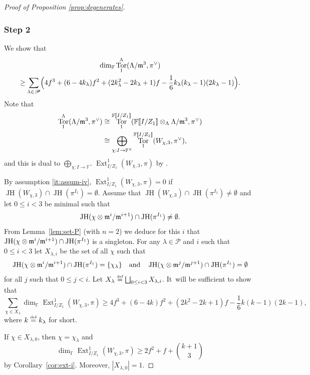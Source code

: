 \documentclass[JEP,XML,SOM,Unicode,NoFloatCountersInSection, NoEqCountersInSection,published]{cedram}
\newcommand{\quand}{\quad\text{and}\quad}
\newcommand{\defeq}{\stackrel{\textrm{\tiny{\upshape{def}}}}{=}}
\newcommand{\F}{\mathbb{F}}
\renewcommand{\P}{\mathscr P}
\newcommand{\s}{^\times}
\newcommand{\bbra}[1]{[\mkern-3mu[#1]\mkern-3mu]}
\DeclareMathOperator{\Ext}{Ext}
\DeclareMathOperator{\JH}{\mathrm{JH}}
\DeclareMathOperator{\Tor}{Tor}
\theoremstyle{plain}
\theoremstyle{definition}
\begin{document}
\begin{proof}[Proof of Proposition \ref{prop:degenerates}]
\subsubsection*{Step 2} We show that
\begin{multline*}
\dim_\F \Tor_1^{\Lambda}(\Lambda/\m^3,\pi^{\vee})\\
\ge \sum_{\lambda \in \P} \Bigl(4f^3 + (6-4k_\lambda)f^2 + (2k_\lambda^2-2k_\lambda+1)f - \frac 16 k_\lambda(k_\lambda-1)(2k_\lambda-1)\Bigr).
\end{multline*}
Note that
\begin{equation}\label{eq:Tor1-direct-sum}
\begin{aligned}
\Tor_1^{\Lambda}(\Lambda/\m^3,\pi^{\vee}) &\cong \Tor_1^{\F\bbra{I/Z_1}}(\F\bbra{I/Z_1} \otimes_\Lambda \Lambda/\m^3,\pi^{\vee})\\
&\cong \bigoplus_{\chi: I \to \F\s} \Tor_1^{\F\bbra{I/Z_1}}(W_{\chi,3},\pi^{\vee}),
\end{aligned}
\end{equation}
and this is dual to $\bigoplus_{\chi: I \to \F\s} \Ext^1_{I/Z_1}(W_{\chi,3},\pi)$ by \cite[Lem.\,2.6.2]{BHHMS4}.

By assumption \eqref{it:assum-iv}, $\Ext^1_{I/Z_1}(W_{\chi,3},\pi) = 0$ if $\JH(W_{\chi,3}) \cap \JH(\pi^{I_1}) = \emptyset$.
Assume that $\JH(W_{\chi,3}) \cap \JH(\pi^{I_1}) \ne \emptyset$ and let $0 \le i < 3$ be minimal such that
\[
\JH(\chi \otimes \m^i/\m^{i+1}) \cap \JH(\pi^{I_1}) \neq \emptyset.
\]
From Lemma~\ref{lem:set-P} (with $n = 2$) we deduce for this $i$ that $\JH(\chi \otimes \m^i/\m^{i+1}) \cap \JH(\pi^{I_1})$ is a singleton.
For any $\lambda \in \P$ and $i$ such that $0 \le i < 3$ let $X_{\lambda,i}$ be the set of all $\chi$ such that
\[
\JH(\chi \otimes \m^i/\m^{i+1}) \cap \JH(\pi^{I_1}) = \{\chi_\lambda\}\quand\JH(\chi \otimes \m^j/\m^{j+1}) \cap \JH(\pi^{I_1}) = \emptyset
\]
for all $j$ such that $0 \le j < i$.
Let $X_\lambda \defeq \bigsqcup_{0 \le i < 3} X_{\lambda,i}$. It~will be sufficient to show that
\begin{equation*}
\sum_{\chi \in X_{\lambda}} \dim_\F \Ext^1_{I/Z_1}(W_{\chi,3},\pi) \ge 4f^3 + (6-4k)f^2 + (2k^2-2k+1)f - \frac 16 k(k-1)(2k-1),
\end{equation*}
where $k \defeq k_\lambda$ for short.

If $\chi \in X_{\lambda,0}$, then $\chi = \chi_\lambda$ and
\begin{equation*}
\dim_\F \Ext^1_{I/Z_1}(W_{\chi,3},\pi) \ge 2f^2+f+\binom{k+1}3
\end{equation*}
by Corollary~\ref{cor:ext-i}.
Moreover, $|X_{\lambda,0}| = 1$.


\end{proof}
\end{document}
